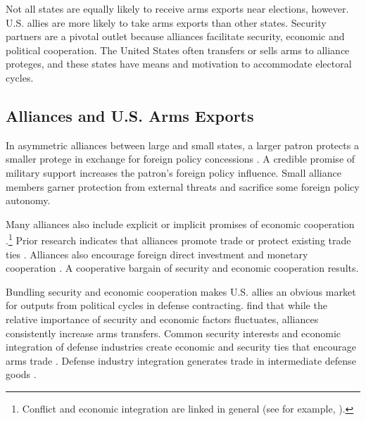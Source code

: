 \documentclass[12pt]{article}
\begin{document}
Not all states are equally likely to receive arms exports near elections, however. 
U.S. allies are more likely to take arms exports than other states. 
Security partners are a pivotal outlet because alliances facilitate security, economic and political cooperation.
The United States often transfers or sells arms to alliance proteges, and these states have means and motivation to accommodate electoral cycles. 



\subsection{Alliances and U.S. Arms Exports}


In asymmetric alliances between large and small states, a larger patron protects a smaller protege in exchange for foreign policy concessions \citep{Morrow1991}.
A credible promise of military support increases the patron's foreign policy influence. 
Small alliance members garner protection from external threats and sacrifice some foreign policy autonomy. 


Many alliances also include explicit or implicit promises of economic cooperation \citep{GowaMansfield2004, LongLeeds2006, Davis2008, Poast2012}.\footnote{Conflict and economic integration are linked in general (see for example, \citep{GartzkeLi2003, Chen2021}).}
Prior research indicates that alliances promote trade \citep{Gowa1995, GowaMansfield2004, Haim2016} or protect existing trade ties \citep{Fordham2010}.
Alliances also encourage foreign direct investment \citep{LiVashchilko2010} and monetary cooperation \citep{Li2003}.
A cooperative bargain of security and economic cooperation results. 


Bundling security and economic cooperation makes U.S. allies an obvious market for outputs from political cycles in defense contracting.
\citet{Thurneretal2019} find that while the relative importance of security and economic factors fluctuates, alliances consistently increase arms transfers.
Common security interests and economic integration of defense industries create economic and security ties that encourage arms trade \citep{Bitzinger1994}. 
Defense industry integration generates trade in intermediate defense goods \citep{Brooks2005}. 
\end{document}
